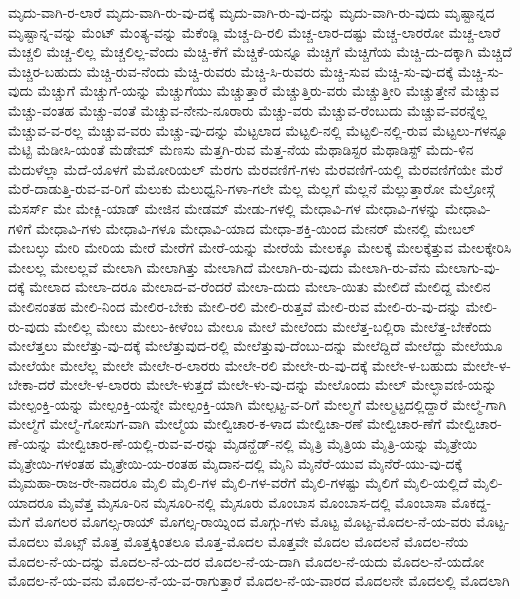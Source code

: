 {ಮೃದು-ವಾಗಿ-ರ-ಲಾರೆ
ಮೃದು-ವಾಗಿ-ರು-ವು-ದಕ್ಕೆ
ಮೃದು-ವಾಗಿ-ರು-ವು-ದನ್ನು
ಮೃದು-ವಾಗಿ-ರು-ವುದು
ಮೃಷ್ಟಾನ್ನದ
ಮೃಷ್ಟಾನ್ನ-ವನ್ನು
ಮೆಂಟ್
ಮೆಂತ್ಯ-ವನ್ನು
ಮೆಕೆಂಡ್ಲಿ
ಮೆಚ್ಚ-ದಿ-ರಲಿ
ಮೆಚ್ಚ-ಲಾರ-ದಷ್ಟು
ಮೆಚ್ಚ-ಲಾರರೋ
ಮೆಚ್ಚ-ಲಾರೆ
ಮೆಚ್ಚಲಿ
ಮೆಚ್ಚ-ಲಿಲ್ಲ
ಮೆಚ್ಚಲಿಲ್ಲ-ವೆಂದು
ಮೆಚ್ಚಿ-ಕೆಗೆ
ಮೆಚ್ಚಿಕೆ-ಯನ್ನೂ
ಮೆಚ್ಚಿಗೆ
ಮೆಚ್ಚಿಗೆಯ
ಮೆಚ್ಚಿ-ದು-ದಕ್ಕಾಗಿ
ಮೆಚ್ಚಿದೆ
ಮೆಚ್ಚಿರ-ಬಹುದು
ಮೆಚ್ಚಿ-ರುವ-ನೆಂದು
ಮೆಚ್ಚಿ-ರುವರು
ಮೆಚ್ಚಿ-ಸಿ-ರುವರು
ಮೆಚ್ಚಿ-ಸುವ
ಮೆಚ್ಚಿ-ಸು-ವು-ದಕ್ಕೆ
ಮೆಚ್ಚಿ-ಸು-ವುದು
ಮೆಚ್ಚುಗೆ
ಮೆಚ್ಚುಗೆ-ಯನ್ನು
ಮೆಚ್ಚುಗೆಯು
ಮೆಚ್ಚುತ್ತಾರೆ
ಮೆಚ್ಚುತ್ತಿರು-ವರು
ಮೆಚ್ಚುತ್ತೀರಿ
ಮೆಚ್ಚುತ್ತೇನೆ
ಮೆಚ್ಚುವ
ಮೆಚ್ಚು-ವಂತಹ
ಮೆಚ್ಚು-ವಂತೆ
ಮೆಚ್ಚುವ-ನೇನು-ನೂರಾರು
ಮೆಚ್ಚು-ವರು
ಮೆಚ್ಚುವ-ರೆಂಬುದು
ಮೆಚ್ಚುವ-ವರನ್ನೆಲ್ಲ
ಮೆಚ್ಚುವ-ವ-ರಲ್ಲ
ಮೆಚ್ಚುವ-ವರು
ಮೆಚ್ಚು-ವು-ದನ್ನು
ಮೆಟ್ಟಲಾದ
ಮೆಟ್ಟಲಿ-ನಲ್ಲಿ
ಮೆಟ್ಟಲಿ-ನಲ್ಲಿ-ರುವ
ಮೆಟ್ಟಲು-ಗಳನ್ನೂ
ಮೆಟ್ಟಿ
ಮೆಡೀಸಿ-ಯಂತೆ
ಮೆಡೇಮ್
ಮೆಣಸು
ಮೆತ್ತಗಿ-ರುವ
ಮೆತ್ತ-ನೆಯ
ಮೆಥಾಡಿಸ್ಟರ
ಮೆಥಾಡಿಸ್ಟ್
ಮೆದು-ಳಿನ
ಮೆದುಳೆಲ್ಲಾ
ಮೆದೆ-ಯೊಳಗೆ
ಮೆಮೋರಿಯಲ್
ಮೆರಗು
ಮೆರವಣಿಗೆ-ಗಳು
ಮೆರವಣಿಗೆ-ಯಲ್ಲಿ
ಮೆರವಣಿಗೆಯೇ
ಮೆರೆ
ಮೆರೆ-ದಾಡುತ್ತಿ-ರುವ-ವ-ರಿಗೆ
ಮೆಲುಕು
ಮೆಲುಧ್ವನಿ-ಗಳಾ-ಗಲೇ
ಮೆಲ್ಲ
ಮೆಲ್ಲಗೆ
ಮೆಲ್ಲನೆ
ಮೆಲ್ಲುತ್ತಾರೋ
ಮೆಲ್ರೋಸ್ಗೆ
ಮೆಸರ್ಸ್
ಮೇ
ಮೇಕ್ಲಿ-ಯಾಡ್
ಮೇಜಿನ
ಮೇಡಮ್
ಮೇಡು-ಗಳಲ್ಲಿ
ಮೇಧಾವಿ-ಗಳ
ಮೇಧಾವಿ-ಗಳನ್ನು
ಮೇಧಾವಿ-ಗಳಿಗೆ
ಮೇಧಾವಿ-ಗಳು
ಮೇಧಾವಿ-ಗಳೂ
ಮೇಧಾವಿ-ಯಾದ
ಮೇಧಾ-ಶಕ್ತಿ-ಯಿಂದ
ಮೇನರ್
ಮೇನಲ್ಲಿ
ಮೇಬಲ್
ಮೇಬಲ್ಳು
ಮೇರಿ
ಮೇರಿಯ
ಮೇರೆ
ಮೇರೆಗೆ
ಮೇರೆ-ಯನ್ನು
ಮೇರೆಯೆ
ಮೇಲಕ್ಕೂ
ಮೇಲಕ್ಕೆ
ಮೇಲಕ್ಕೆತ್ತುವ
ಮೇಲಕ್ಕೇರಿಸಿ
ಮೇಲಲ್ಲ
ಮೇಲಲ್ಲವೆ
ಮೇಲಾಗಿ
ಮೇಲಾಗಿತ್ತು
ಮೇಲಾಗಿದೆ
ಮೇಲಾಗಿ-ರು-ವುದು
ಮೇಲಾಗಿ-ರು-ವೆನು
ಮೇಲಾಗು-ವು-ದಕ್ಕೆ
ಮೇಲಾದ
ಮೇಲಾ-ದರೂ
ಮೇಲಾದ-ವ-ರೆಂದರೆ
ಮೇಲಾ-ದುದು
ಮೇಲಾ-ಯಿತು
ಮೇಲಿದೆ
ಮೇಲಿದ್ದ
ಮೇಲಿನ
ಮೇಲಿನಂತಹ
ಮೇಲಿ-ನಿಂದ
ಮೇಲಿರ-ಬೇಕು
ಮೇಲಿ-ರಲಿ
ಮೇಲಿ-ರುತ್ತವೆ
ಮೇಲಿ-ರುವ
ಮೇಲಿ-ರು-ವು-ದನ್ನು
ಮೇಲಿ-ರು-ವುದು
ಮೇಲಿಲ್ಲ
ಮೇಲು
ಮೇಲು-ಕೀಳೆಂಬ
ಮೇಲೂ
ಮೇಲೆ
ಮೇಲೆಂದು
ಮೇಲೆತ್ತ-ಬಲ್ಲಿರಾ
ಮೇಲೆತ್ತ-ಬೇಕೆಂದು
ಮೇಲೆತ್ತಲು
ಮೇಲೆತ್ತು-ವು-ದಕ್ಕೆ
ಮೇಲೆತ್ತುವುದ-ರಲ್ಲಿ
ಮೇಲೆತ್ತುವು-ದೆಂಬು-ದನ್ನು
ಮೇಲೆದ್ದಿದೆ
ಮೇಲೆದ್ದು
ಮೇಲೆಯೂ
ಮೇಲೆಯೇ
ಮೇಲೆಲ್ಲ
ಮೇಲೇ
ಮೇಲೇ-ರ-ಲಾರರು
ಮೇಲೇ-ರಲಿ
ಮೇಲೇ-ರು-ವು-ದಕ್ಕೆ
ಮೇಲೇ-ಳ-ಬಹುದು
ಮೇಲೇ-ಳ-ಬೇಕಾ-ದರೆ
ಮೇಲೇ-ಳ-ಲಾರರು
ಮೇಲೇ-ಳುತ್ತದೆ
ಮೇಲೇ-ಳು-ವು-ದನ್ನು
ಮೇಲೊಂದು
ಮೇಲ್
ಮೇಲ್ಛಾವಣಿ-ಯನ್ನು
ಮೇಲ್ಪಂಕ್ತಿ-ಯನ್ನು
ಮೇಲ್ಪಂಕ್ತಿ-ಯನ್ನೇ
ಮೇಲ್ಪಂಕ್ತಿ-ಯಾಗಿ
ಮೇಲ್ಪಟ್ಟ-ವ-ರಿಗೆ
ಮೇಲ್ಮಗೆ
ಮೇಲ್ಮಟ್ಟದಲ್ಲಿದ್ದಾರೆ
ಮೇಲ್ಮೆ-ಗಾಗಿ
ಮೇಲ್ಮೆಗೆ
ಮೇಲ್ಮೆ-ಗೋಸುಗ-ವಾಗಿ
ಮೇಲ್ಮೆಯ
ಮೇಲ್ವಿಚಾರ-ಕ-ಳಾದ
ಮೇಲ್ವಿಚಾ-ರಣೆ
ಮೇಲ್ವಿಚಾರ-ಣೆಗೆ
ಮೇಲ್ವಿಚಾರ-ಣೆ-ಯನ್ನು
ಮೇಲ್ವಿಚಾರ-ಣೆ-ಯಲ್ಲಿ-ರುವ-ವ-ರನ್ನು
ಮೈಡನ್ಹೆಡ್-ನಲ್ಲಿ
ಮೈತ್ರಿ
ಮೈತ್ರಿಯ
ಮೈತ್ರಿ-ಯನ್ನು
ಮೈತ್ರೇಯಿ
ಮೈತ್ರೇಯಿ-ಗಳಂತಹ
ಮೈತ್ರೇಯಿ-ಯ-ರಂತಹ
ಮೈದಾನ-ದಲ್ಲಿ
ಮೈನಿ
ಮೈನೆರೆ-ಯುವ
ಮೈನೆರೆ-ಯು-ವು-ದಕ್ಕೆ
ಮೈಮಹಾ-ರಾಜ-ರೇ-ನಾದರೂ
ಮೈಲಿ
ಮೈಲಿ-ಗಳ
ಮೈಲಿ-ಗಳ-ವರೆಗೆ
ಮೈಲಿ-ಗಳಷ್ಟು
ಮೈಲಿಗೆ
ಮೈಲಿ-ಯಲ್ಲಿದೆ
ಮೈಲಿ-ಯಾದರೂ
ಮೈವೆತ್ತ
ಮೈಸೂ-ರಿನ
ಮೈಸೂರಿ-ನಲ್ಲಿ
ಮೈಸೂರು
ಮೊಂಬಾಸ
ಮೊಂಬಾಸ-ದಲ್ಲಿ
ಮೊಂಬಾಸಾ
ಮೊಕದ್ದ-ಮೆಗೆ
ಮೊಗಲರ
ಮೊಗಲ್ಸ-ರಾಯ್
ಮೊಗಲ್ಸ-ರಾಯ್ನಿಂದ
ಮೊಗ್ಗು-ಗಳು
ಮೊಟ್ಟ
ಮೊಟ್ಟ-ಮೊದಲ-ನೆ-ಯ-ವರು
ಮೊಟ್ಟ-ಮೊದಲು
ಮೊಟ್ಸ್
ಮೊತ್ತ
ಮೊತ್ತಕ್ಕಿಂತಲೂ
ಮೊತ್ತ-ಮೊದಲ
ಮೊತ್ತವೇ
ಮೊದಲ
ಮೊದಲನೆ
ಮೊದಲ-ನೆಯ
ಮೊದಲ-ನೆ-ಯ-ದನ್ನು
ಮೊದಲ-ನೆ-ಯ-ದರ
ಮೊದಲ-ನೆ-ಯ-ದಾಗಿ
ಮೊದಲ-ನೆ-ಯದು
ಮೊದಲ-ನೆ-ಯದೋ
ಮೊದಲ-ನೆ-ಯ-ವನು
ಮೊದಲ-ನೆ-ಯ-ವ-ರಾಗುತ್ತಾರೆ
ಮೊದಲ-ನೆ-ಯ-ವಾರದ
ಮೊದಲನೇ
ಮೊದಲಲ್ಲಿ
ಮೊದಲಾಗಿ
}
